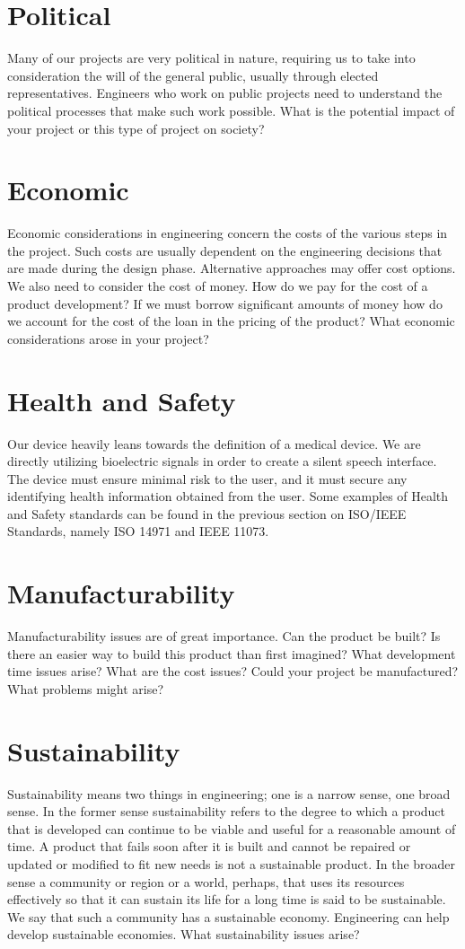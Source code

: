 \section{Political}
Many of our projects are very political in nature, requiring us to take into consideration the will of the general public, usually through elected representatives. Engineers who work on public projects need to understand the political processes that make such work possible. What is the potential impact of your project or this type of project on society?

\section{Economic}
Economic considerations in engineering concern the costs of the various steps in the project. Such costs are usually dependent on the engineering decisions that are made during the design phase. Alternative approaches may offer cost options. We also need to consider the cost of money. How do we pay for the cost of a product development? If we must borrow significant amounts of money how do we account for the cost of the loan in the pricing of the product? What economic considerations arose in your project?

\section{Health and Safety}
Our device heavily leans towards the definition of a medical device. We are directly utilizing bioelectric signals
 in order to create a silent speech interface. The device must ensure minimal risk to the user, and it must secure any
 identifying health information obtained from the user. Some examples of Health and Safety standards can be found in the previous
 section on ISO/IEEE Standards, namely ISO 14971 and IEEE 11073.

\section{Manufacturability}
Manufacturability issues are of great importance. Can the product be built? Is there an easier way to build this product than first imagined? What development time issues arise? What are the cost issues? Could your project be manufactured? What problems might arise?

\section{Sustainability} 
Sustainability means two things in engineering; one is a narrow sense, one broad sense. In the former sense sustainability refers to the degree to which a product that is developed can continue to be viable and useful for a reasonable amount of time. A product that fails soon after it is built and cannot be repaired or updated or modified to fit new needs is not a sustainable product. In the broader sense a community or region or a world, perhaps, that uses its resources effectively so that it can sustain its life for a long time is said to be sustainable. We say that such a community has a sustainable economy. Engineering can help develop sustainable economies. What sustainability issues arise?

